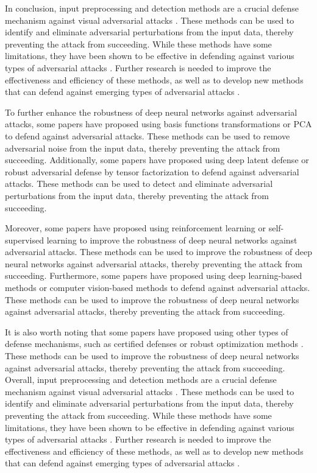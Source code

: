 \documentclass[11pt]{article}
\begin{document}
In conclusion, input preprocessing and detection methods are a crucial defense mechanism against visual adversarial attacks \cite{ref6}. These methods can be used to identify and eliminate adversarial perturbations from the input data, thereby preventing the attack from succeeding. While these methods have some limitations, they have been shown to be effective in defending against various types of adversarial attacks \cite{ref128,ref127}. Further research is needed to improve the effectiveness and efficiency of these methods, as well as to develop new methods that can defend against emerging types of adversarial attacks \cite{ref6}.

To further enhance the robustness of deep neural networks against adversarial attacks, some papers have proposed using basis functions transformations \cite{ref51} or PCA \cite{ref135} to defend against adversarial attacks. These methods can be used to remove adversarial noise from the input data, thereby preventing the attack from succeeding. Additionally, some papers have proposed using deep latent defense \cite{ref136} or robust adversarial defense by tensor factorization \cite{ref137} to defend against adversarial attacks. These methods can be used to detect and eliminate adversarial perturbations from the input data, thereby preventing the attack from succeeding.

Moreover, some papers have proposed using reinforcement learning \cite{ref105} or self-supervised learning \cite{ref138} to improve the robustness of deep neural networks against adversarial attacks. These methods can be used to improve the robustness of deep neural networks against adversarial attacks, thereby preventing the attack from succeeding. Furthermore, some papers have proposed using deep learning-based methods \cite{ref139} or computer vision-based methods \cite{ref6} to defend against adversarial attacks. These methods can be used to improve the robustness of deep neural networks against adversarial attacks, thereby preventing the attack from succeeding.

It is also worth noting that some papers have proposed using other types of defense mechanisms, such as certified defenses \cite{ref39} or robust optimization methods \cite{ref106}. These methods can be used to improve the robustness of deep neural networks against adversarial attacks, thereby preventing the attack from succeeding. Overall, input preprocessing and detection methods are a crucial defense mechanism against visual adversarial attacks \cite{ref6}. These methods can be used to identify and eliminate adversarial perturbations from the input data, thereby preventing the attack from succeeding. While these methods have some limitations, they have been shown to be effective in defending against various types of adversarial attacks \cite{ref128,ref127}. Further research is needed to improve the effectiveness and efficiency of these methods, as well as to develop new methods that can defend against emerging types of adversarial attacks \cite{ref6}.
\end{document}

